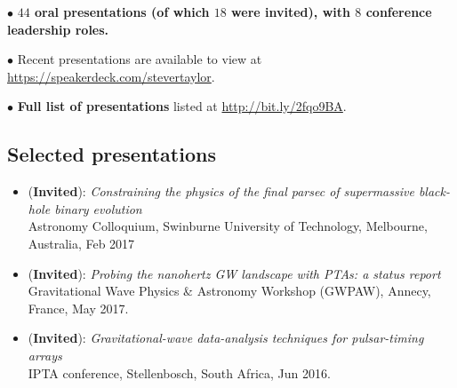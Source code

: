\documentclass[11pt,letterpaper,sans]{moderncv}
\begin{document}
$\bullet$ \textbf{$44$ oral presentations (of which $18$ were invited), with $8$ conference leadership roles.}

$\bullet$ Recent presentations are available to view at {\color{color1} \href{https://speakerdeck.com/stevertaylor}{https://speakerdeck.com/stevertaylor}}.

$\bullet$ \textbf{Full list of presentations} listed at {\color{color1} \href{http://bit.ly/2fqo9BA}{http://bit.ly/2fqo9BA}}.

\subsection{Selected presentations}

\begin{itemize}[leftmargin=8mm]

\item (\textbf{Invited}): \textit{Constraining the physics of the final parsec of supermassive black-hole binary evolution} \\ Astronomy Colloquium, Swinburne University of Technology, Melbourne, Australia, Feb 2017

\item (\textbf{Invited}): \textit{Probing the nanohertz GW landscape with PTAs: a status report} \\ Gravitational Wave Physics \& Astronomy Workshop (GWPAW), Annecy, France, May 2017.

\item (\textbf{Invited}): \textit{Gravitational-wave data-analysis techniques for pulsar-timing arrays} \\ IPTA conference, Stellenbosch, South Africa, Jun 2016.

\end{itemize}
\end{document}
